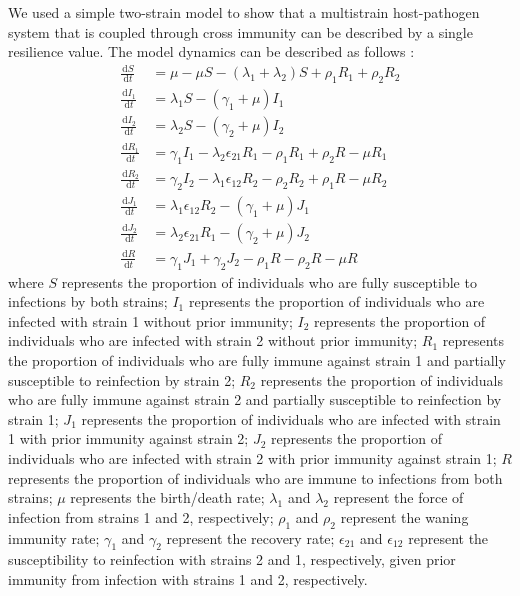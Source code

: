 \documentclass[12pt]{article}
\newcommand{\dd}[1]{\ensuremath{\, \mathrm{d}#1}}
\begin{document}
We used a simple two-strain model to show that a multistrain host-pathogen system that is coupled through cross immunity can be described by a single resilience value.
The model dynamics can be described as follows \citep{bhattacharyya2015cross}: 
\begin{align}
\frac{\dd S}{\dd t} &= \mu - \mu S - (\lambda_1 + \lambda_2) S + \rho_1 R_1 + \rho_2 R_2 \\
\frac{\dd I_1}{\dd t} &= \lambda_1 S - (\gamma_1 + \mu) I_1 \\
\frac{\dd I_2}{\dd t} &= \lambda_2 S - (\gamma_2 + \mu) I_2 \\
\frac{\dd R_1}{\dd t} &= \gamma_1 I_1 - \lambda_2 \epsilon_{21} R_1 - \rho_1 R_1 + \rho_2 R - \mu R_1\\
\frac{\dd R_2}{\dd t} &= \gamma_2 I_2 - \lambda_1 \epsilon_{12} R_2 - \rho_2 R_2 + \rho_1 R - \mu R_2\\
\frac{\dd J_1}{\dd t} &= \lambda_1 \epsilon_{12} R_2 - (\gamma_1 + \mu) J_1\\
\frac{\dd J_2}{\dd t} &= \lambda_2 \epsilon_{21} R_1 - (\gamma_2 + \mu) J_2\\
\frac{\dd R}{\dd t} &= \gamma_1 J_1 + \gamma_2 J_2 - \rho_1 R - \rho_2 R - \mu R
\end{align}
where $S$ represents the proportion of individuals who are fully susceptible to infections by both strains;
$I_1$ represents the proportion of individuals who are infected with strain 1 without prior immunity;
$I_2$ represents the proportion of individuals who are infected with strain 2 without prior immunity;
$R_1$ represents the proportion of individuals who are fully immune against strain 1 and partially susceptible to reinfection by strain 2;
$R_2$ represents the proportion of individuals who are fully immune against strain 2 and partially susceptible to reinfection by strain 1;
$J_1$ represents the proportion of individuals who are infected with strain 1 with prior immunity against strain 2;
$J_2$ represents the proportion of individuals who are infected with strain 2 with prior immunity against strain 1;
$R$ represents the proportion of individuals who are immune to infections from both strains;
$\mu$ represents the birth/death rate;
$\lambda_1$ and $\lambda_2$ represent the force of infection from strains 1 and 2, respectively;
$\rho_1$ and $\rho_2$ represent the waning immunity rate;
$\gamma_1$ and $\gamma_2$ represent the recovery rate;
$\epsilon_{21}$ and $\epsilon_{12}$ represent the susceptibility to reinfection with strains 2 and 1, respectively, given prior immunity from infection with strains 1 and 2, respectively. 
\end{document}
